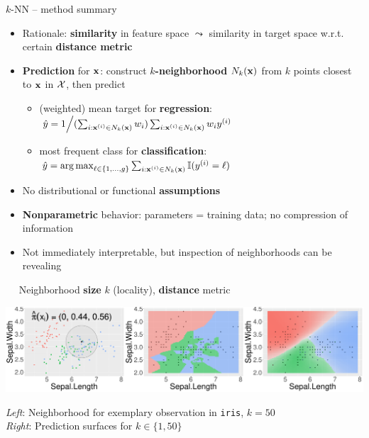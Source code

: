 \begin{frame}{$k$-NN -- method summary}

 
 

\medskip

\begin{itemize}
  \item Rationale: \textbf{similarity} in feature space $\leadsto$ similarity 
  in target space w.r.t. certain \textbf{distance metric}
  \item \textbf{Prediction} for $\mathbf{x}$: construct \textbf{$k$-neighborhood} 
  $N_k(\mathbf{x})$ from $k$ points closest to $\mathbf{x}$ in $\mathcal{X}$, then 
  predict
  \begin{itemize}
    \footnotesize
    \item (weighted) mean target for \textbf{regression}: 
    $\left. \hat{y} = 1 \middle/ 
    (\sum_{i: \mathbf{x}^{(i)} \in N_k(\mathbf{x})} w_i) \sum_{i: \mathbf{x}^{(i)} \in N_k(\mathbf{x})} w_i y^{(i)} \right.$
    \item most frequent class for \textbf{classification}: 
    $\hat{y} = \operatorname{arg\,max}_{\ell \in \{1, \ldots, g\}} \sum_{i: \mathbf{x}^{(i)} \in N_k(\mathbf{x})} \mathbb{I}(y^{(i)} = \ell)$
  \end{itemize}
  \item No distributional or functional \textbf{assumptions}
  \item \textbf{Nonparametric} behavior: parameters = training data; no 
  compression of information
  \item Not immediately interpretable, but inspection of neighborhoods can be revealing
\end{itemize}

\medskip

 ~~ Neighborhood \textbf{size} $k$ (locality), 
\textbf{distance} metric

\vfill

\begin{minipage}{0.7\textwidth}
  \includegraphics[width=\textwidth]{figure/knn-neighborhood.pdf}
\end{minipage}%
\hfill
\begin{minipage}{0.25\textwidth}
  \tiny
  \raggedright
  \textit{Left}: Neighborhood for exemplary observation in \texttt{iris}, 
  $k = 50$ \\
  \textit{Right}: Prediction surfaces for $k \in \{1, 50\}$
\end{minipage}
\end{frame}


